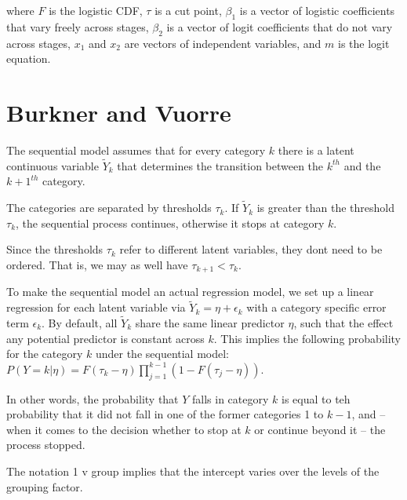 where $F$ is the logistic CDF, $\tau$ is a cut point, $\beta_{1}$ is a vector of logistic coefficients that vary freely across stages, $\beta_{2}$ is a vector of logit coefficients that do not vary across stages, $x_{1}$ and $x_{2}$ are vectors of independent variables, and $m$ is the logit equation.


\section{Burkner and Vuorre}


The sequential model assumes that for every category $k$ there is a latent continuous variable $\tilde Y_{k}$ that determines the transition between the $k^{th}$ and the $k+1^{th}$ category.

The categories are separated by thresholds $\tau_{k}$. If $\tilde Y_{k}$ is greater than the threshold $\tau_{k}$, the sequential process continues, otherwise it stops at category $k$.

Since the thresholds $\tau_{k}$ refer to different latent variables, they dont need to be ordered. That is, we may as well have $\tau_{k+1} < \tau_{k}$.

To make the sequential model an actual regression model, we set up a linear regression for each latent variable via $\tilde Y_{k} = \eta + \epsilon_{k}$ with a category specific error term $\epsilon_{k}$. By default, all $\tilde Y_{k}$ share the same linear predictor $\eta$, such that the effect any potential predictor is constant across $k$. This implies the following probability for the category $k$ under the sequential model: $P(Y=k | \eta) = F(\tau_{k} - \eta) \prod_{j=1}^{k-1} ( 1 - F(\tau_{j} - \eta) )$.

In other words, the probability that $Y$ falls in category $k$ is equal to teh probability that it did not fall in one of the former categories 1 to $k-1$, and -- when it comes to the decision whether to stop at $k$ or continue beyond it -- the process stopped.

The notation 1 v group implies that the intercept varies over the levels of the grouping factor.

